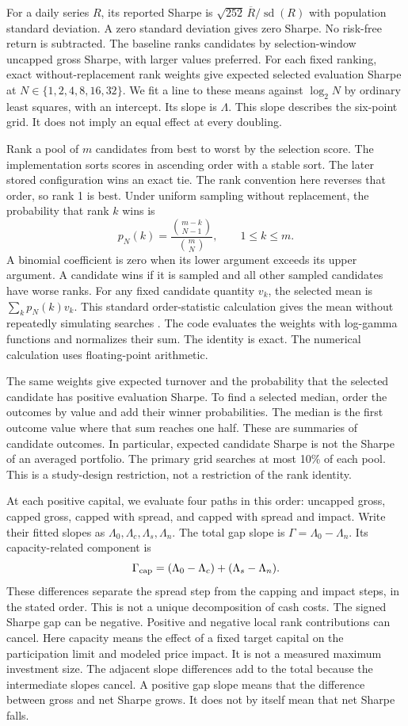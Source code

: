 \documentclass[10pt,letterpaper]{article}
\begin{document}
For a daily series $R$, its reported Sharpe is $\sqrt{252}\,\overline R/\operatorname{sd}(R)$ with population standard deviation. A zero standard deviation gives zero Sharpe. No risk-free return is subtracted. The baseline ranks candidates by selection-window uncapped gross Sharpe, with larger values preferred. For each fixed ranking, exact without-replacement rank weights give expected selected evaluation Sharpe at $N\in\{1,2,4,8,16,32\}$. We fit a line to these means against $\log_2N$ by ordinary least squares, with an intercept. Its slope is $\Lambda$. This slope describes the six-point grid. It does not imply an equal effect at every doubling.

Rank a pool of $m$ candidates from best to worst by the selection score. The implementation sorts scores in ascending order with a stable sort. The later stored configuration wins an exact tie. The rank convention here reverses that order, so rank 1 is best. Under uniform sampling without replacement, the probability that rank $k$ wins is
\[
 p_N(k)=\frac{\binom{m-k}{N-1}}{\binom{m}{N}},\qquad 1\leq k\leq m.
\]
A binomial coefficient is zero when its lower argument exceeds its upper argument. A candidate wins if it is sampled and all other sampled candidates have worse ranks. For any fixed candidate quantity $v_k$, the selected mean is $\sum_k p_N(k)v_k$. This standard order-statistic calculation gives the mean without repeatedly simulating searches \citep{oneill2023order}. The code evaluates the weights with log-gamma functions and normalizes their sum. The identity is exact. The numerical calculation uses floating-point arithmetic.

The same weights give expected turnover and the probability that the selected candidate has positive evaluation Sharpe. To find a selected median, order the outcomes by value and add their winner probabilities. The median is the first outcome value where that sum reaches one half. These are summaries of candidate outcomes. In particular, expected candidate Sharpe is not the Sharpe of an averaged portfolio. The primary grid searches at most 10\% of each pool. This is a study-design restriction, not a restriction of the rank identity.


At each positive capital, we evaluate four paths in this order: uncapped gross, capped gross, capped with spread, and capped with spread and impact. Write their fitted slopes as $\Lambda_0,\Lambda_c,\Lambda_s,\Lambda_n$. The total gap slope is $\Gamma=\Lambda_0-\Lambda_n$. Its capacity-related component is
\[
 \Gamma_{\rm cap}=(\Lambda_0-\Lambda_c)+(\Lambda_s-\Lambda_n).
\]
These differences separate the spread step from the capping and impact steps, in the stated order. This is not a unique decomposition of cash costs. The signed Sharpe gap can be negative. Positive and negative local rank contributions can cancel.
Here capacity means the effect of a fixed target capital on the participation limit and modeled price impact. It is not a measured maximum investment size. The adjacent slope differences add to the total because the intermediate slopes cancel. A positive gap slope means that the difference between gross and net Sharpe grows. It does not by itself mean that net Sharpe falls.
\end{document}
